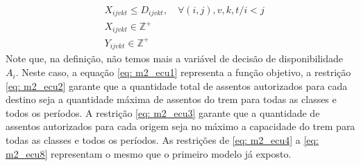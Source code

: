 \begin{align}
	 & X_{ijvkt} \leq D_{ijvkt},  \quad \forall (i,j),v,k,t/ i < j                                                                                             \label{eq: m2_ecu6}                                                                                                              \\[15pt]
	 & X_{ijvkt} \in \mathbb{Z}^+                                                                                                                              \label{eq: m2_ecu7}                                                                                                              \\
	 & Y_{ijvkt} \in \mathbb{Z}^+                                                                                                                              \label{eq: m2_ecu8}
\end{align}
Note que, na definição, não temos mais a variável de decisão de disponibilidade \(A_i\). Neste caso, a equação \ref{eq: m2_ecu1} representa a função objetivo, a restrição \ref{eq: m2_ecu2} garante que a quantidade total de assentos autorizados para cada destino seja a quantidade máxima de assentos do trem para todas as classes e todos os períodos. A restrição \ref{eq: m2_ecu3} garante que a quantidade de assentos autorizados para cada origem seja no máximo a capacidade do trem para todas as classes e todos os períodos. As restrições de \ref{eq: m2_ecu4} a \ref{eq: m2_ecu8} representam o mesmo que o primeiro modelo já exposto.
